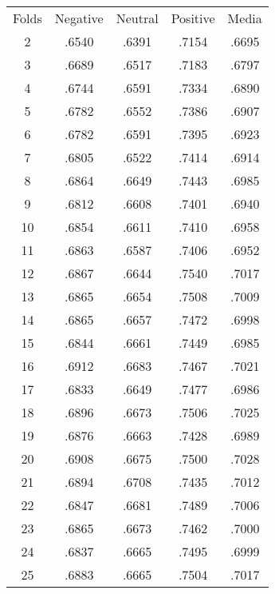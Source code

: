 \documentclass[a4paper,10pt]{article} %
\begin{document}
\begin{tabular} {ccccc}
    Folds & Negative & Neutral & Positive & Media  \\
    2     & .6540    & .6391   & .7154    & .6695  \\
    3     & .6689    & .6517   & .7183    & .6797  \\
    4     & .6744    & .6591   & .7334    & .6890  \\
    5     & .6782    & .6552   & .7386    & .6907  \\
    6     & .6782    & .6591   & .7395    & .6923  \\
    7     & .6805    & .6522   & .7414    & .6914  \\
    8     & .6864    & .6649   & .7443    & .6985  \\
    9     & .6812    & .6608   & .7401    & .6940  \\
    10    & .6854    & .6611   & .7410    & .6958  \\
    11    & .6863    & .6587   & .7406    & .6952  \\
    12    & .6867    & .6644   & .7540    & .7017  \\
    13    & .6865    & .6654   & .7508    & .7009  \\
    14    & .6865    & .6657   & .7472    & .6998  \\
    15    & .6844    & .6661   & .7449    & .6985  \\
    16    & .6912    & .6683   & .7467    & .7021  \\
    17    & .6833    & .6649   & .7477    & .6986  \\
    18    & .6896    & .6673   & .7506    & .7025  \\
    19    & .6876    & .6663   & .7428    & .6989  \\
    20    & .6908    & .6675   & .7500    & .7028  \\
    21    & .6894    & .6708   & .7435    & .7012  \\
    22    & .6847    & .6681   & .7489    & .7006  \\
    23    & .6865    & .6673   & .7462    & .7000  \\
    24    & .6837    & .6665   & .7495    & .6999  \\
    25    & .6883    & .6665   & .7504    & .7017  \\
\end{tabular}
\end{document}
